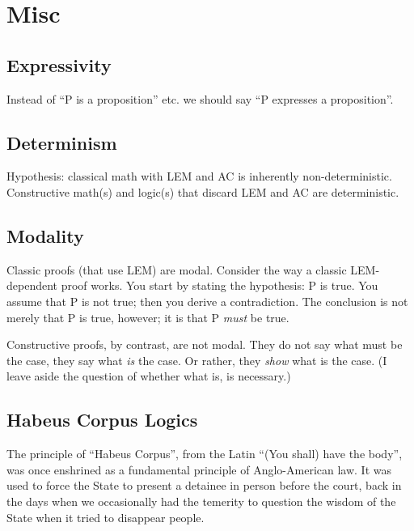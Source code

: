 \chapter{Misc}
\section{Expressivity}
\label{sect:expressivity}

Instead of ``P is a proposition'' etc. we should say ``P expresses a proposition''.

\section{Determinism}
\label{sect:determinism}

Hypothesis: classical math with LEM and AC is inherently
non-deterministic.  Constructive math(s) and logic(s) that discard LEM
and AC are deterministic.

\section{Modality}
\label{sect:modality}

Classic proofs (that use LEM) are modal.  Consider the way a classic
LEM-dependent proof works.  You start by stating the hypothesis: P is
true.  You assume that P is not true; then you derive a contradiction.
The conclusion is not merely that P is true, however; it is that P
\textit{must} be true.

Constructive proofs, by contrast, are not modal.  They do not say what
must be the case, they say what \textit{is} the case.  Or rather, they
\textit{show} what is the case.  (I leave aside the question of
whether what is, is necessary.)

\section{Habeus Corpus Logics}
\label{sect:habeus}

The principle of ``Habeus Corpus'', from the Latin ``(You shall) have
the body'', was once enshrined as a fundamental principle of
Anglo-American law.  It was used to force the State to present a
detainee in person before the court, back in the days when we
occasionally had the temerity to question the wisdom of the State when
it tried to disappear people.


